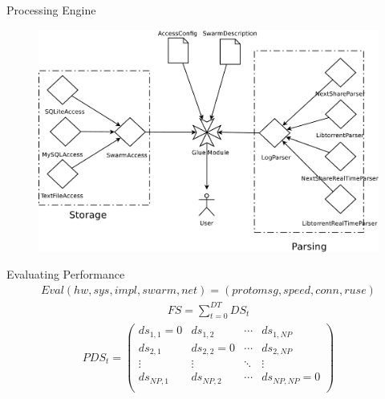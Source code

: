 \documentclass{beamer}
\begin{document}
\begin{frame}{Processing Engine}
  \begin{figure}
    \includegraphics[scale=0.5]{img/ppf-architecture}
  \end{figure}
\end{frame}

\begin{frame}{Evaluating Performance}
  \footnotesize
  \begin{align}
    Eval(hw, sys, impl, swarm, net) = (protomsg, speed, conn, ruse)
  \end{align}
  \begin{align}
    FS = \sum_{t=0}^{DT} DS_{t}
  \end{align}
  \begin{align}
    PDS_{t} =
    \begin{pmatrix}
      ds_{1,1} = 0 & ds_{1,2} & \cdots & ds_{1,NP} \\
      ds_{2,1} & ds_{2,2} = 0 & \cdots & ds_{2,NP} \\
      \vdots & \vdots & \ddots & \vdots \\
      ds_{NP,1} & ds_{NP,2} & \cdots & ds_{NP,NP} = 0 \\
    \end{pmatrix}
  \end{align}
\end{frame}
\end{document}
